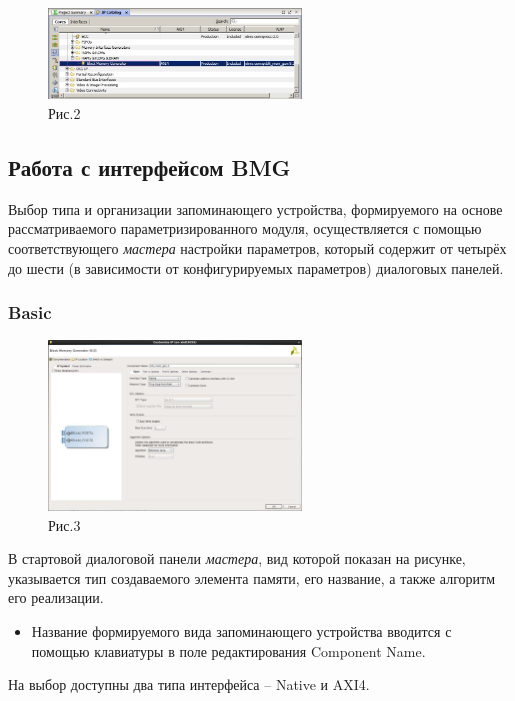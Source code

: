\begin{figure}[H]
\centering
\includegraphics[width=0.6\textwidth]{2}
\caption{Рис.2}
\label{2_label}
\end{figure}

\subsection{Работа с интерфейсом BMG} 
Выбор типа и организации запоминающего устройства, формируемого на основе рассматриваемого параметризированного модуля, осуществляется с помощью соответствующего \emph {мастера} настройки параметров, который содержит от четырёх до шести (в зависимости от конфигурируемых параметров) диалоговых панелей.

\subsubsection{Basic}

\begin{figure}[h]
\centering
\includegraphics[width=0.6\textwidth]{3}
\caption{Рис.3}
\label{3_label}
\end{figure}

В стартовой диалоговой панели \emph {мастера}, вид которой показан на рисунке, указывается тип создаваемого элемента памяти, его название, а также алгоритм его реализации. 
\begin{itemize}
\item Название формируемого вида запоминающего устройства вводится с помощью клавиатуры в поле редактирования Component Name.
\end{itemize}

На выбор доступны два типа интерфейса – Native и AXI4.

